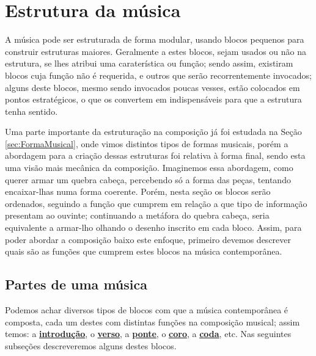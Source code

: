 
\section{Estrutura da música}
\label{sec:estruturadamusica}

A música pode ser estruturada de forma modular, 
usando blocos pequenos para construir estruturas maiores.
Geralmente a estes blocos, sejam usados ou não na estrutura, se lhes atribui uma caraterística ou função;
sendo assim, existiram blocos cuja função não é requerida,
e outros que serão recorrentemente invocados;
alguns deste blocos, mesmo sendo invocados poucas vesses, 
estão colocados em pontos estratégicos, o que os convertem em indispensáveis 
para que a estrutura tenha sentido.

Uma parte importante da estruturação na composição já foi estudada na Seção \ref{sec:FormaMusical},
onde vimos distintos tipos de formas musicais, 
porém a abordagem para a criação dessas estruturas foi relativa à forma final,
sendo esta uma visão mais mecânica da composição.
Imaginemos essa abordagem, como querer armar um quebra cabeça,
percebendo só a forma das peças, tentando encaixar-lhas numa forma coerente.
Porém, nesta seção  os blocos serão ordenados, 
seguindo a função que cumprem em relação a que tipo de informação presentam ao ouvinte;
continuando a metáfora do quebra cabeça, seria equivalente a armar-lho olhando o desenho inscrito em cada bloco.
Assim, para poder abordar a composição baixo este enfoque, 
primeiro devemos descrever quais são as funções que cumprem estes blocos na música contemporânea.


\subsection{Partes de uma música}
\label{subsec:partesmusica}
 Podemos achar diversos tipos de blocos com que a música contemporânea é composta, 
cada um destes com distintas funções na composição musical;
assim temos:
a \hyperref[ref:Introducao]{\textbf{introdução}},
o \hyperref[ref:Verse]{\textbf{verso}},
a \hyperref[ref:Ponte]{\textbf{ponte}},
o \hyperref[ref:Coro]{\textbf{coro}},
a \hyperref[ref:Coda]{\textbf{coda}},
etc.
Nas seguintes subseções descreveremos alguns destes blocos.

